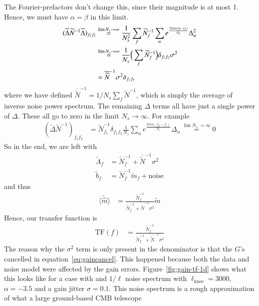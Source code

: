 \documentclass{aa}
\begin{document}
The Fourier-prefactors don't change this, since their magnitude is at most 1. Hence, we must have $\alpha=\beta$ in this limit.
\begin{align}
(\widetilde\Delta \widetilde{N}^{-1} \widetilde{\Delta})_{f_1f_2} &\stackrel{\lim N_s\rightarrow\infty}{=}
\frac{1}{N_s^2} \sum_f \widetilde{N}^{-1}_f \sum_\alpha e^{\frac{2\pi i \alpha (f_2-f_1)}{N_s}} \Delta_\alpha^2 \notag \\
&\stackrel{\lim N_s\rightarrow\infty}{=}
\frac{1}{N_s} \Big(\sum_f \widetilde{N}^{-1}_f\Big) \delta_{f_1f_2}\sigma^2 \notag \\
&= \overline{\widetilde{N}}^{-1}\sigma^2 \delta_{f_1f_2}
\end{align}
where we have defined $\overline{\widetilde{N}}^{-1} = 1/N_s \sum_f \widetilde{N}^{-1}$,
which is simply the average of inverse noise power spectrum.
The remaining $\Delta$ terms all have just a single power of $\Delta$. These all go to
zero in the limit $N_s \rightarrow \infty$. For example
\begin{align}
(\widetilde\Delta \widetilde{N}^{-1})_{f_1f_2} &= \widetilde{N}^{-1}_{f_1} \delta_{f_1 f_2} \frac{1}{N_s} \sum_\alpha e^{\frac{2\pi i \alpha (f_2-f_1)}{N_s}} \Delta_\alpha \stackrel{\lim N_s\rightarrow\infty}{=} 0
\end{align}
So in the end, we are left with
\begin{align}
\widetilde{A}_f &= \widetilde{N}^{-1}_f + \overline{\widetilde{N}}^{-1} \sigma^2 \\
\widetilde{b}_f &= \widetilde{N}^{-1}_f \widetilde{m}_f + \text{noise}
\end{align}
and thus
\begin{align}
\langle\widetilde{\hat{m}}\rangle &= \frac{\widetilde{N}^{-1}_f}{\widetilde{N}^{-1}_f + \overline{\widetilde{N}}^{-1} \sigma^2} \widetilde{m}
\end{align}
Hence, our transfer function is
\begin{align}
	\text{TF}(f) &= \frac{\widetilde{N}^{-1}_f}{\widetilde{N}^{-1}_f + \overline{\widetilde{N}}^{-1} \sigma^2}
\end{align}
The reason why the $\sigma^2$ term is only present in the denominator is that the
$G$'s cancelled in equation~\ref{eq:gaincancel}. This happened because both the data and noise model
were affected by the gain errors.
Figure~\ref{fig:gain-tf-1d} shows what this looks like for a case with
and $1/\ell$ noise spectrum with
$\ell_\text{knee} = 3000$, $\alpha = -3.5$ and a gain jitter $\sigma = 0.1$.
This noise spectrum is a rough approximation of what a large ground-based CMB telescope
\end{document}
